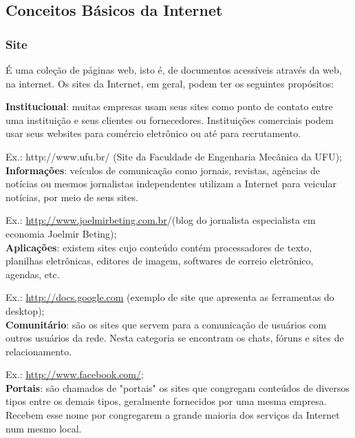 \documentclass[hidelinks,12pt]{article}
\begin{document}
		\subsection{Conceitos Básicos da Internet}
		
			
			 \subsubsection{Site}
			
			É uma coleção de páginas web, isto é, de documentos acessíveis através da web, na internet. Os sites da Internet, em geral, podem ter os seguintes propósitos:
			
			 \textbf{Institucional}: muitas empresas usam seus sites como ponto de contato entre uma instituição e seus clientes ou fornecedores. Instituições comerciais podem usar seus websites para comércio eletrônico ou até para recrutamento. 
			
			Ex.: http://www.ufu.br/ (Site da Faculdade de Engenharia Mecânica da UFU);\\
			
			
			 \textbf{Informações}: veículos de comunicação como jornais, revistas, agências de notícias ou mesmos jornalistas independentes utilizam a Internet para veicular notícias, por meio de seus sites. 
			
			Ex.: \url{http://www.joelmirbeting.com.br}/(blog do jornalista especialista em economia Joelmir Beting);\\
			
			
			 \textbf{Aplicações}: existem sites cujo conteúdo contém processadores de texto, planilhas eletrônicas, editores de imagem, softwares de correio eletrônico, agendas, etc. 
			
			Ex.: \url{http://docs.google.com} (exemplo de site que apresenta as ferramentas do desktop);\\
			
			
			 \textbf{Comunitário}: são os sites que servem para a comunicação de usuários com outros usuários da rede. Nesta categoria se encontram os chats, fóruns e sites de relacionamento. 
			
			Ex.: \url{http://www.facebook.com/};\\
			
			
			\textbf{Portais}: são chamados de "portais" os sites que congregam conteúdos de diversos tipos entre os demais tipos, geralmente fornecidos por uma mesma empresa. Recebem esse nome por congregarem a grande maioria dos serviços da Internet num mesmo local. 
			
\end{document}
